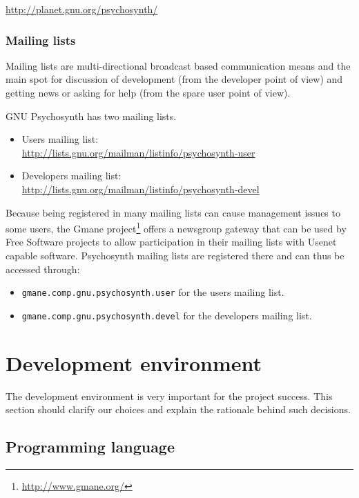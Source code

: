 \url{http://planet.gnu.org/psychosynth/}

\subsubsection{Mailing lists}

Mailing lists are multi-directional broadcast based communication
means and the main spot for discussion of development (from the
developer point of view) and getting news or asking for help (from the
spare user point of view).

GNU Psychosynth has two mailing lists.
\begin{itemize}
\item Users mailing list: \\
\url{http://lists.gnu.org/mailman/listinfo/psychosynth-user}

\item Developers mailing list:\\
\url{http://lists.gnu.org/mailman/listinfo/psychosynth-devel}
\end{itemize}

Because being registered in many mailing lists can cause management
issues to some users, the Gmane
project\footnote{\url{http://www.gmane.org/}} offers a newsgroup
gateway that can be used by Free Software projects to allow
participation in their mailing lists with Usenet capable
software. Psychosynth mailing lists are registered there and can thus
be accessed through:
\begin{itemize}
\item \verb|gmane.comp.gnu.psychosynth.user| for the users
  mailing list.
\item \verb|gmane.comp.gnu.psychosynth.devel| for the developers
  mailing list.
\end{itemize}

\section{Development environment}

The development environment is very important for the project
success. This section should clarify our choices and explain the
rationale behind such decisions.

\subsection{Programming language}

